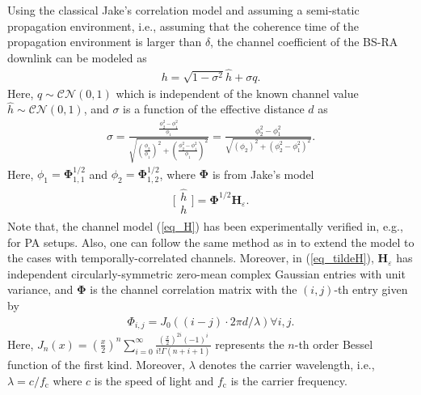 Using the classical Jake's correlation model \cite[p. 2642]{Shin2003TITcapacity} and  assuming a semi-static propagation environment, i.e., assuming that the coherence time of the propagation environment is larger than $\delta$,  the channel coefficient of the BS-RA downlink can be modeled as 
\begin{align}\label{eq_H}
    h = \sqrt{1-\sigma^2} \hat{h} + \sigma q.
\end{align}
Here, $q \sim \mathcal{CN}(0,1)$ which is independent of the known channel value $\hat{h}\sim \mathcal{CN}(0,1)$, and $\sigma$ is a function of the effective distance $d$ as 
\begin{align}
    \sigma = \frac{\frac{\phi_2^2-\phi_1^2}{\phi_1}}{\sqrt{ \left(\frac{\phi_2}{\phi_1}\right)^2 + \left(\frac{\phi_2^2-\phi_1^2}{\phi_1}\right)^2 }} = \frac{\phi_2^2-\phi_1^2}{\sqrt{ \left(\phi_2\right)^2 + \left(\phi_2^2-\phi_1^2\right)^2 }} .
\end{align}
Here, $\phi_1 = \bm{\Phi}_{1,1}^{1/2} $ and $\phi_2 = \bm{\Phi}_{1,2}^{1/2} $, where $\bm{\Phi}$ is  from Jake's model \cite[p. 2642]{Shin2003TITcapacity}
\begin{align}\label{eq_tildeH}
     \bigl[ \begin{smallmatrix}
  \hat{h}\\h
\end{smallmatrix} \bigr]= \bm{\Phi}^{1/2} \bm{H}_{\varepsilon}.
\end{align}
Note that, the channel model (\ref{eq_H}) has been experimentally verified in, e.g., \cite{Jamaly2014EuCAP} for PA setups. Also, one can follow the same method as in \cite{Guo2019WCLrate} to extend the model to the cases with temporally-correlated channels. Moreover, in (\ref{eq_tildeH}), $\bm{H}_{\varepsilon}$ has independent circularly-symmetric zero-mean complex Gaussian entries with unit variance, and $\bm{\Phi}$ is the channel correlation matrix with the $(i,j)$-th entry given by
\begin{align}\label{eq_phi}
    \Phi_{i,j} = J_0\left((i-j)\cdot2\pi d/ \lambda\right) \forall i,j.
\end{align}
Here, $J_n(x) = (\frac{x}{2})^n \sum_{i=0}^{\infty}\frac{(\frac{x}{2})^{2i}(-1)^{i} }{i!\Gamma(n+i+1)}$ represents the $n$-th order Bessel function of the first kind. Moreover, $\lambda$ denotes the carrier wavelength, i.e., $\lambda = c/f_\text{c}$ where $c$ is the speed of light and $f_\text{c}$ is the carrier frequency. 






